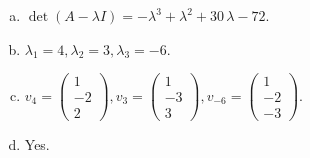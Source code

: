 \begin{questions}
\begin{solution}
\begin{enumerate}[(a)]
\item $\det(A-\lambda I)=-{\lambda}^{3} + {\lambda}^{2} + 30 \, {\lambda} - 72$.
\item ${\lambda}_1=4, {\lambda}_2=3, {\lambda}_3=-6$.
\item $v_{4}=\left(\begin{array}{r}
1 \\
-2 \\
2
\end{array}\right), v_{3}=\left(\begin{array}{r}
1 \\
-3 \\
3
\end{array}\right), v_{-6}=\left(\begin{array}{r}
1 \\
-2 \\
-3
\end{array}\right)$.
\item Yes.
\end{enumerate}
\end{solution}

\end{questions}

\newpage


\begin{center}
\end{center}

